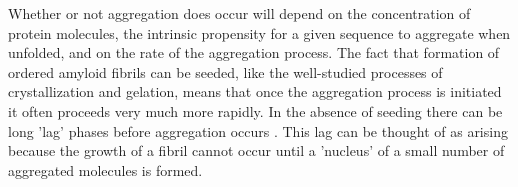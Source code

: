 





Whether or not aggregation does occur will depend on the concentration of protein molecules, the intrinsic propensity for a given sequence to aggregate when unfolded, and on the rate of the aggregation process. 
The fact that formation of ordered amyloid fibrils can be seeded, like the well-studied processes of crystallization
and gelation, means that once the aggregation process is initiated it often proceeds very much more rapidly.
In the absence of seeding there can be long 'lag' phases before aggregation occurs . 
This lag can be thought of as arising because the growth of a fibril cannot occur until a 'nucleus' of a small number
of aggregated molecules is formed. 

